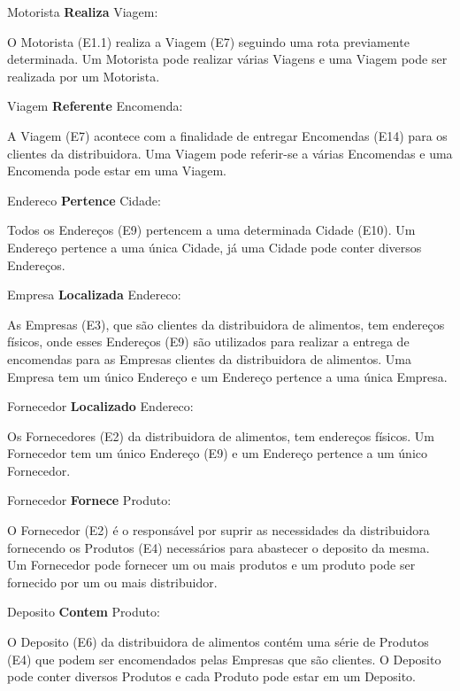 \documentclass[12pt, onecolumn, titlepage]{article}
\begin{document}
\begin{description}
\item Motorista \textbf{Realiza} Viagem: 
\item \qquad O Motorista (E1.1) realiza a Viagem (E7) seguindo uma rota previamente determinada. Um Motorista pode realizar várias Viagens e uma Viagem pode ser realizada por um Motorista.

\item Viagem \textbf{Referente} Encomenda: 
\item \qquad A Viagem (E7) acontece com a finalidade de entregar Encomendas (E14) para os clientes da distribuidora. Uma Viagem pode referir-se a várias Encomendas e uma Encomenda pode estar em uma Viagem.

\item Endereco \textbf{Pertence} Cidade: 
\item \qquad Todos os Endereços (E9) pertencem a uma determinada Cidade (E10). Um Endereço pertence a uma única Cidade, já uma Cidade pode conter diversos Endereços.

\item Empresa \textbf{Localizada} Endereco: 
\item \qquad As Empresas (E3), que são clientes da distribuidora de alimentos, tem endereços físicos, onde esses Endereços (E9) são utilizados para realizar a entrega de encomendas para as Empresas clientes da distribuidora de alimentos. Uma Empresa tem um único Endereço e um Endereço pertence a uma única Empresa.

\item Fornecedor \textbf{Localizado} Endereco: 
\item \qquad Os Fornecedores (E2) da distribuidora de alimentos, tem endereços físicos. Um Fornecedor tem um único Endereço (E9) e um Endereço pertence a um único Fornecedor.

\item Fornecedor \textbf{Fornece} Produto: 
\item \qquad O Fornecedor (E2) é o responsável por suprir as necessidades da distribuidora fornecendo os Produtos (E4) necessários para abastecer o deposito da mesma. Um Fornecedor pode fornecer um ou mais produtos e um produto pode ser fornecido por um ou mais distribuidor.

\item Deposito \textbf{Contem} Produto: 
\item \qquad O Deposito (E6) da distribuidora de alimentos contém uma série de Produtos (E4) que podem ser encomendados pelas Empresas que são clientes. O Deposito pode conter diversos Produtos e cada Produto pode estar em um Deposito.


\end{description}
\end{document}
